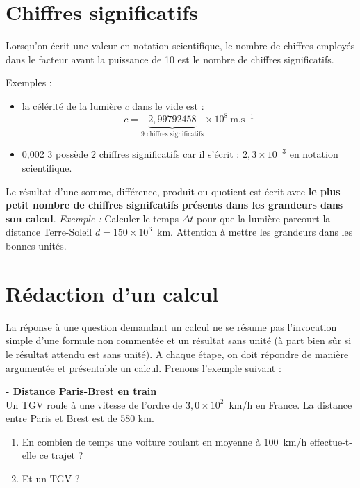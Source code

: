 \section{Chiffres significatifs}

\begin{tcolorbox}
[colback=green!5!white,colframe=green!75!black,title=\textbf{Chiffre significatif}]
Lorsqu’on écrit une valeur en notation scientifique, le nombre de chiffres employés dans le facteur avant la puissance de 10 est le nombre de chiffres significatifs.\\
\end{tcolorbox}
Exemples : 
\begin{itemize}
    \item la célérité de la lumière $c$ dans le vide est :
\begin{equation*}
    c =\underbrace{2,99 792458}_{\text{9 chiffres significatifs}}\times 10^8~\text{m.s}^{-1}
\end{equation*}
\item 0,002 3 possède 2 chiffres significatifs car il s'écrit : $2,3\times10^{-3}$ en notation scientifique.
\end{itemize}

\begin{tcolorbox}[colback=red!5!white,colframe=red!75!black,title=Règles à retenir sur les chiffres significatifs]
Le résultat d'une somme, différence, produit ou quotient est écrit avec \textbf{le plus petit nombre de chiffres signifcatifs présents dans les grandeurs dans son calcul}.
\newline
\newline
\textit{Exemple : } Calculer le temps $\Delta t$ pour que la lumière parcourt la distance Terre-Soleil $d=150\times 10^{6}$~km. Attention à mettre les grandeurs dans les bonnes unités.
\end{tcolorbox}


\section{Rédaction d'un calcul}
La réponse à une question demandant un calcul ne se résume pas l'invocation simple d'une formule non commentée et un résultat sans unité (à part bien sûr si le résultat attendu est sans unité). A chaque étape, on doit répondre de manière argumentée et présentable un calcul. Prenons l'exemple suivant : 

\begin{mdframed}[style=autreexo]
\textbf{ - Distance Paris-Brest en train}\\
 Un TGV roule à une vitesse de l'ordre de $3,0\times 10^{2}$~km/h en France. La distance entre Paris et Brest est de 580 km.
\begin{enumerate}
\item En combien de temps une voiture roulant en moyenne à $100$~km/h effectue-t-elle ce trajet ?
\item Et un TGV ?
\end{enumerate}
\end{mdframed}

